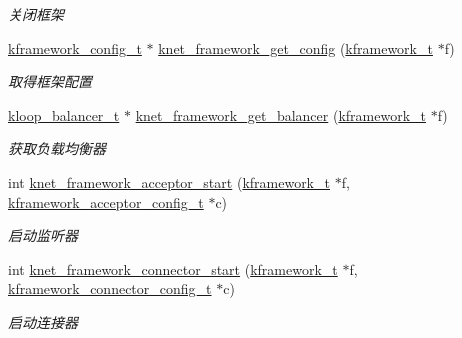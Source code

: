 \begin{DoxyCompactItemize}
\begin{DoxyCompactList}\small\item\em 关闭框架 \end{DoxyCompactList}\item 
\hyperlink{a00051_adeaf952e0f0887507ff836385bf54874_adeaf952e0f0887507ff836385bf54874}{kframework\+\_\+config\+\_\+t} $\ast$ \hyperlink{a00103_ga2fcd8c172557a78fe7edbba0e7f9da40_ga2fcd8c172557a78fe7edbba0e7f9da40}{knet\+\_\+framework\+\_\+get\+\_\+config} (\hyperlink{a00051_a3195a3be35782fc1efb920c811be111d_a3195a3be35782fc1efb920c811be111d}{kframework\+\_\+t} $\ast$f)
\begin{DoxyCompactList}\small\item\em 取得框架配置 \end{DoxyCompactList}\item 
\hyperlink{a00051_abd3f964265beb2f8984e76f44fb5ea33_abd3f964265beb2f8984e76f44fb5ea33}{kloop\+\_\+balancer\+\_\+t} $\ast$ \hyperlink{a00052_a5bda21127c93214014579d21f6efd643_a5bda21127c93214014579d21f6efd643}{knet\+\_\+framework\+\_\+get\+\_\+balancer} (\hyperlink{a00051_a3195a3be35782fc1efb920c811be111d_a3195a3be35782fc1efb920c811be111d}{kframework\+\_\+t} $\ast$f)
\begin{DoxyCompactList}\small\item\em 获取负载均衡器 \end{DoxyCompactList}\item 
int \hyperlink{a00103_gae3f68614153df18fabd1c7d148ce826b_gae3f68614153df18fabd1c7d148ce826b}{knet\+\_\+framework\+\_\+acceptor\+\_\+start} (\hyperlink{a00051_a3195a3be35782fc1efb920c811be111d_a3195a3be35782fc1efb920c811be111d}{kframework\+\_\+t} $\ast$f, \hyperlink{a00051_a39c993eb450173e4fde04498d757f9b6_a39c993eb450173e4fde04498d757f9b6}{kframework\+\_\+acceptor\+\_\+config\+\_\+t} $\ast$c)
\begin{DoxyCompactList}\small\item\em 启动监听器 \end{DoxyCompactList}\item 
int \hyperlink{a00103_ga28cdba2072f2c191547c0450d040d536_ga28cdba2072f2c191547c0450d040d536}{knet\+\_\+framework\+\_\+connector\+\_\+start} (\hyperlink{a00051_a3195a3be35782fc1efb920c811be111d_a3195a3be35782fc1efb920c811be111d}{kframework\+\_\+t} $\ast$f, \hyperlink{a00051_a44d3033eba5a4fd784a741700a7a2521_a44d3033eba5a4fd784a741700a7a2521}{kframework\+\_\+connector\+\_\+config\+\_\+t} $\ast$c)
\begin{DoxyCompactList}\small\item\em 启动连接器 \end{DoxyCompactList}\item 

\end{DoxyCompactItemize}
